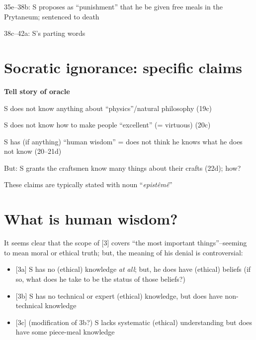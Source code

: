 \documentclass[11pt]{article}
\begin{document}
\noindent 35e--38b: S proposes as ``punishment'' that he be given free meals in the Prytaneum; sentenced to death
\vspace*{2mm}

\noindent 38c--42a: S's parting words

\vspace*{-3mm}
\section*{Socratic ignorance: specific claims}

\noindent \textbf{Tell story of oracle}
\vspace*{2mm}

\noindent [1] S does not know anything about ``physics''/natural philosophy (19c)
\vspace*{2mm}

\noindent [2] S does not know how to make people ``excellent'' (= virtuous) (20c)
\vspace*{2mm}

\noindent [3] S has (if anything) ``human wisdom'' = does not think he knows what he does not know (20--21d)
\vspace*{2mm}

\noindent [4] But: S grants the craftsmen know many things about their crafts (22d); how?
\vspace*{2mm}

\noindent These claims are typically stated with noun ``\emph{epist\^{e}m\^{e}}''
\vspace*{-3mm}


\section*{What is human wisdom?}

\noindent It seems clear that the scope of [3] covers ``the most important things''--seeming to mean moral or ethical truth; but, the meaning of his denial is controversial:\begin{itemize}\item{[3a] S has no (ethical) knowledge \emph{at all}; but, he does have (ethical) beliefs (if so, what does he take to be the status of those beliefs?)}\item{[3b] S has no technical or expert (ethical) knowledge, but does have non-technical knowledge}\item{[3c] (modification of 3b?) S lacks systematic (ethical) understanding but does have some piece-meal knowledge}\end{itemize}
\vspace*{2mm}
\end{document}
